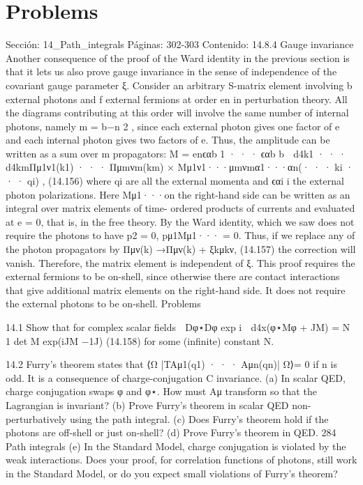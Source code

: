 \section*{Problems}
Sección: 14_Path_integrals
Páginas: 302-303
Contenido:
14.8.4 Gauge invariance
Another consequence of the proof of the Ward identity in the previous section is that it
lets us also prove gauge invariance in the sense of independence of the covariant gauge
parameter ξ. Consider an arbitrary S-matrix element involving b external photons and f
external fermions at order en in perturbation theory. All the diagrams contributing at this
order will involve the same number of internal photons, namely m =
b−n
2 , since each
external photon gives one factor of e and each internal photon gives two factors of e. Thus,
the amplitude can be written as a sum over m propagators:
M = enϵαb
1 · · · ϵαb
b

d4k1 · · · d4kmΠμ1ν1(k1) · · · Πμmνm(km)
× Mμ1ν1···μmνmα1···αn(· · · ki · · · qi) ,
(14.156)
where qi are all the external momenta and ϵαi
i
the external photon polarizations. Here
Mμ1···on the right-hand side can be written as an integral over matrix elements of time-
ordered products of currents and evaluated at e = 0, that is, in the free theory.
By the Ward identity, which we saw does not require the photons to have p2 = 0,
pμ1Mμ1··· = 0. Thus, if we replace any of the photon propagators by
Πμν(k) →Πμν(k) + ξkμkν,
(14.157)
the correction will vanish. Therefore, the matrix element is independent of ξ. This proof
requires the external fermions to be on-shell, since otherwise there are contact interactions
that give additional matrix elements on the right-hand side. It does not require the external
photons to be on-shell.
Problems

14.1 Show that for complex scalar ﬁelds

Dφ⋆Dφ exp
i

d4x(φ⋆Mφ + JM)
= N
1
det M exp(iJM −1J)
(14.158)
for some (inﬁnite) constant N.

14.2 Furry’s theorem states that ⟨Ω |T{Aμ1(q1) · · · Aμn(qn)}| Ω⟩= 0 if n is odd. It is a
consequence of charge-conjugation C invariance.
(a) In scalar QED, charge conjugation swaps φ and φ⋆. How must Aμ transform so
that the Lagrangian is invariant?
(b) Prove Furry’s theorem in scalar QED non-perturbatively using the path integral.
(c) Does Furry’s theorem hold if the photons are off-shell or just on-shell?
(d) Prove Furry’s theorem in QED.
284
Path integrals
(e) In the Standard Model, charge conjugation is violated by the weak interactions.
Does your proof, for correlation functions of photons, still work in the Standard
Model, or do you expect small violations of Furry’s theorem?

